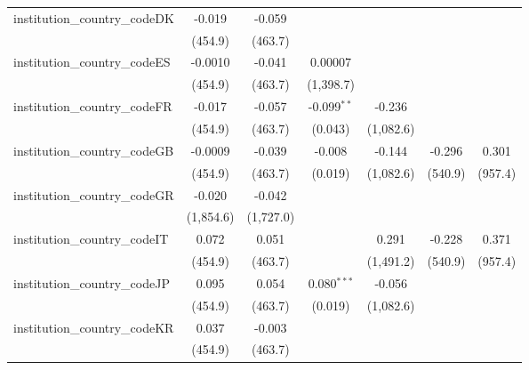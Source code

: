 \begin{tabular}{lcccccc}
   institution\_country\_codeDK          & -0.019        & -0.059        &                &                &           &   \\   
                                         & (454.9)       & (463.7)       &                &                &           &   \\   
   institution\_country\_codeES          & -0.0010       & -0.041        & 0.00007        &                &           &   \\   
                                         & (454.9)       & (463.7)       & (1,398.7)      &                &           &   \\   
   institution\_country\_codeFR          & -0.017        & -0.057        & -0.099$^{**}$  & -0.236         &           &   \\   
                                         & (454.9)       & (463.7)       & (0.043)        & (1,082.6)      &           &   \\   
   institution\_country\_codeGB          & -0.0009       & -0.039        & -0.008         & -0.144         & -0.296    & 0.301\\   
                                         & (454.9)       & (463.7)       & (0.019)        & (1,082.6)      & (540.9)   & (957.4)\\   
   institution\_country\_codeGR          & -0.020        & -0.042        &                &                &           &   \\   
                                         & (1,854.6)     & (1,727.0)     &                &                &           &   \\   
   institution\_country\_codeIT          & 0.072         & 0.051         &                & 0.291          & -0.228    & 0.371\\   
                                         & (454.9)       & (463.7)       &                & (1,491.2)      & (540.9)   & (957.4)\\   
   institution\_country\_codeJP          & 0.095         & 0.054         & 0.080$^{***}$  & -0.056         &           &   \\   
                                         & (454.9)       & (463.7)       & (0.019)        & (1,082.6)      &           &   \\   
   institution\_country\_codeKR          & 0.037         & -0.003        &                &                &           &   \\   
                                         & (454.9)       & (463.7)       &                &                &           &   \\   

\end{tabular}
